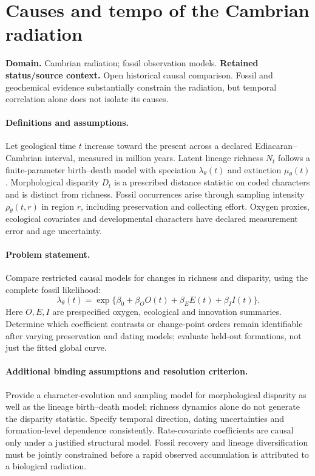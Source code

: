 \documentclass[11pt]{article}
\begin{document}
\section*{Causes and tempo of the Cambrian radiation}
\label{prob:308}
\label{rank:200}
\par\smallskip

\noindent\textbf{Domain.} Cambrian radiation; fossil observation models. \quad \textbf{Retained status/source context.} Open historical causal comparison. Fossil and geochemical evidence substantially constrain the radiation, but temporal correlation alone does not isolate its causes.

\paragraph{Definitions and assumptions.} Let geological time $t$ increase toward the present across a declared Ediacaran--Cambrian interval, measured in million years. Latent lineage richness $N_t$ follows a finite-parameter birth--death model with speciation $\lambda_\theta(t)$ and extinction $\mu_\theta(t)$. Morphological disparity $D_t$ is a prescribed distance statistic on coded characters and is distinct from richness. Fossil occurrences arise through sampling intensity $\rho_\theta(t,r)$ in region $r$, including preservation and collecting effort. Oxygen proxies, ecological covariates and developmental characters have declared measurement error and age uncertainty.

\paragraph{Problem statement.} Compare restricted causal models for changes in richness and disparity, using the complete fossil likelihood:
    \[\lambda_\theta(t)=\exp\{\beta_0+\beta_O O(t)+\beta_E E(t)+\beta_I I(t)\}.\]
    Here $O,E,I$ are prespecified oxygen, ecological and innovation summaries. Determine which coefficient contrasts or change-point orders remain identifiable after varying preservation and dating models; evaluate held-out formations, not just the fitted global curve.

\paragraph{Additional binding assumptions and resolution criterion.} Provide a character-evolution and sampling model for morphological disparity as well as the lineage birth--death model; richness dynamics alone do not generate the disparity statistic. Specify temporal direction, dating uncertainties and formation-level dependence consistently. Rate-covariate coefficients are causal only under a justified structural model. Fossil recovery and lineage diversification must be jointly constrained before a rapid observed accumulation is attributed to a biological radiation.
\end{document}
